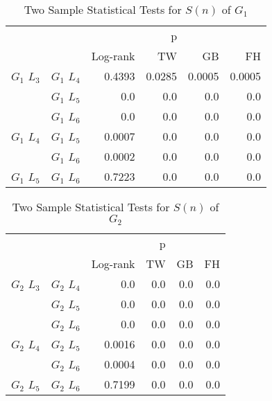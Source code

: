   \begin{table}
        \centering
        \begin{tabular}{llrrrr}
          \toprule
                       &             &         &  p &    &     \\
          \cmidrule{3-6}
                       &             & Log-rank & TW & GB & FH  \\
          \midrule
          $G_1$ $L_3$  & $G_1$ $L_4$  &  0.4393 &  0.0285 &  0.0005 &  0.0005     \\
                       & $G_1$ $L_5$  & 0.0 & 0.0 & 0.0 & 0.0    \\
                       & $G_1$ $L_6$  & 0.0 & 0.0 & 0.0 & 0.0      \\
          $G_1$ $L_4$  & $G_1$ $L_5$  & 0.0007 & 0.0 & 0.0 & 0.0      \\
                       & $G_1$ $L_6$  & 0.0002 & 0.0 & 0.0 & 0.0       \\
          $G_1$ $L_5$   & $G_1$ $L_6$ & 0.7223 &  0.0 & 0.0 & 0.0      \\
          \bottomrule
        \end{tabular}
        \caption{Two Sample Statistical Tests for $S(n)$ of $G_1$}
         \label{tab:g1_ingroup_tests_steps}
      \end{table}


      \begin{table}
        \centering
        \begin{tabular}{llrrrr}
          \toprule
                       &             &         &  p &    &     \\
          \cmidrule{3-6}
                       &             & Log-rank & TW & GB & FH  \\
          \midrule
          $G_2$ $L_3$  & $G_2$ $L_4$  &  0.0 &  0.0 &  0.0 &  0.0     \\
                       & $G_2$ $L_5$  & 0.0 & 0.0 & 0.0 & 0.0    \\
                       & $G_2$ $L_6$  & 0.0 & 0.0 & 0.0 & 0.0      \\
          $G_2$ $L_4$  & $G_2$ $L_5$  & 0.0016 & 0.0 & 0.0 & 0.0      \\
                       & $G_2$ $L_6$  & 0.0004 & 0.0 & 0.0 & 0.0       \\
          $G_2$ $L_5$   & $G_2$ $L_6$ & 0.7199 &  0.0 & 0.0 & 0.0      \\
          \bottomrule
        \end{tabular}
        \caption{Two Sample Statistical Tests for $S(n)$ of $G_2$}
        \label{tab:g2_ingroup_tests_steps}
      \end{table}


